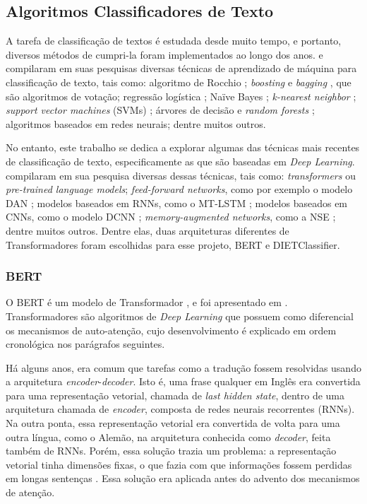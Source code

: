 \subsection{Algoritmos Classificadores de Texto}
\label{modelos ou algoritmos classificadores de texto}
A tarefa de classificação de textos é estudada desde muito tempo, e portanto, diversos métodos de cumpri-la foram implementados ao longo dos anos.  e  compilaram em suas pesquisas diversas técnicas de aprendizado de máquina para classificação de texto, tais como: algoritmo de Rocchio \cite{rocchio}; \textit{boosting} \cite{boosting} e \textit{bagging} \cite{bagging}, que são algoritmos de votação; regressão logística \cite{logistic_regression}; Naïve Bayes \cite{naive_bayes}; \textit{k-nearest neighbor} \cite{k_nearest}; \textit{support vector machines} (SVMs) \cite{svm}; árvores de decisão \cite{decision_tree} e \textit{random forests} \cite{random_forests}; algoritmos baseados em redes neurais; dentre muitos outros.

No entanto, este trabalho se dedica a explorar algumas das técnicas mais recentes de classificação de texto, especificamente as que são baseadas em \textit{Deep Learning}.  compilaram em sua pesquisa diversas dessas técnicas, tais como: \textit{transformers} \cite{attention_is_all_you_need} ou \textit{pre-trained language models}; \textit{feed-forward networks}, como por exemplo o modelo DAN \cite{dan}; modelos baseados em RNNs, como o MT-LSTM \cite{mt-lstm}; modelos baseados em CNNs, como o modelo DCNN \cite{dcnn}; \textit{memory-augmented networks}, como a NSE \cite{nse}; dentre muitos outros. Dentre elas, duas arquiteturas diferentes de Transformadores foram escolhidas para esse projeto, BERT e DIETClassifier.

\subsubsection{BERT}
\label{bert_subsubsection}
O BERT é um modelo de Transformador \cite{attention_is_all_you_need}, e foi apresentado em \cite{bert}. Transformadores são algoritmos de \textit{Deep Learning} que possuem como diferencial os mecanismos de auto-atenção, cujo desenvolvimento é explicado em ordem cronológica nos parágrafos seguintes.

Há alguns anos, era comum que tarefas como a tradução fossem resolvidas usando a arquitetura \textit{encoder}-\textit{decoder}. Isto é, uma frase qualquer em Inglês era convertida para uma representação vetorial, chamada de \textit{last hidden state}, dentro de uma arquitetura chamada de \textit{encoder}, composta de redes neurais recorrentes (RNNs). Na outra ponta, essa representação vetorial era convertida de volta para uma outra língua, como o Alemão, na arquitetura conhecida como \textit{decoder}, feita também de RNNs. Porém, essa solução trazia um problema: a representação vetorial tinha dimensões fixas, o que fazia com que informações fossem perdidas em longas sentenças \cite{transformers_book}. Essa solução era aplicada antes do advento dos mecanismos de atenção.


